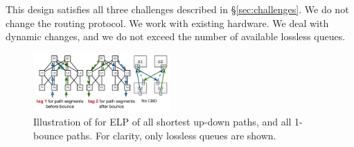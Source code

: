 
This design satisfies all three challenges described in \S\ref{sec:challenges}.
We do not change the routing protocol. We work with existing hardware. We deal
with dynamic changes, and we do not exceed the number of available
lossless queues.

\begin{figure}[t]
	\centering
	\includegraphics[width=0.47\textwidth] {figs/cbd_b}
	\caption{Illustration of \sysname{} for ELP of all shortest up-down paths,
		and all 1-bounce paths. For clarity, only lossless queues are shown.}
	\label{fig:clos_tagger}
		\vspace{-0.15in}
\end{figure}

